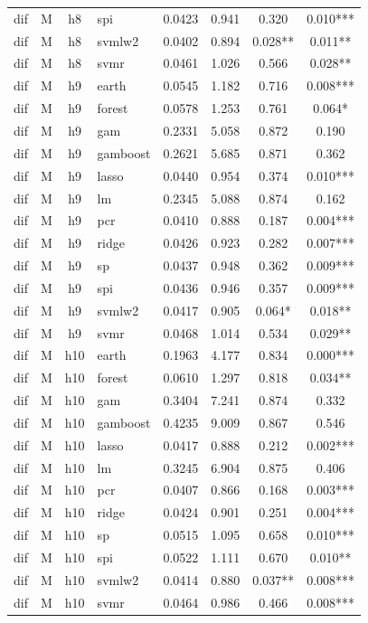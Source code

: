 \begin{ThreePartTable}
\begin{longtable}[t]{llclcccc}
dif & M & h8 & spi & 0.0423 & 0.941 & 0.320 & 0.010***\\
dif & M & h8 & svmlw2 & 0.0402 & 0.894 & 0.028** & 0.011**\\
dif & M & h8 & svmr & 0.0461 & 1.026 & 0.566 & 0.028**\\
\addlinespace
dif & M & h9 & earth & 0.0545 & 1.182 & 0.716 & 0.008***\\
dif & M & h9 & forest & 0.0578 & 1.253 & 0.761 & 0.064*\\
dif & M & h9 & gam & 0.2331 & 5.058 & 0.872 & 0.190\\
dif & M & h9 & gamboost & 0.2621 & 5.685 & 0.871 & 0.362\\
dif & M & h9 & lasso & 0.0440 & 0.954 & 0.374 & 0.010***\\
dif & M & h9 & lm & 0.2345 & 5.088 & 0.874 & 0.162\\
dif & M & h9 & pcr & 0.0410 & 0.888 & 0.187 & 0.004***\\
dif & M & h9 & ridge & 0.0426 & 0.923 & 0.282 & 0.007***\\
dif & M & h9 & sp & 0.0437 & 0.948 & 0.362 & 0.009***\\
dif & M & h9 & spi & 0.0436 & 0.946 & 0.357 & 0.009***\\
dif & M & h9 & svmlw2 & 0.0417 & 0.905 & 0.064* & 0.018**\\
dif & M & h9 & svmr & 0.0468 & 1.014 & 0.534 & 0.029**\\
\addlinespace
dif & M & h10 & earth & 0.1963 & 4.177 & 0.834 & 0.000***\\
dif & M & h10 & forest & 0.0610 & 1.297 & 0.818 & 0.034**\\
dif & M & h10 & gam & 0.3404 & 7.241 & 0.874 & 0.332\\
dif & M & h10 & gamboost & 0.4235 & 9.009 & 0.867 & 0.546\\
dif & M & h10 & lasso & 0.0417 & 0.888 & 0.212 & 0.002***\\
dif & M & h10 & lm & 0.3245 & 6.904 & 0.875 & 0.406\\
dif & M & h10 & pcr & 0.0407 & 0.866 & 0.168 & 0.003***\\
dif & M & h10 & ridge & 0.0424 & 0.901 & 0.251 & 0.004***\\
dif & M & h10 & sp & 0.0515 & 1.095 & 0.658 & 0.010***\\
dif & M & h10 & spi & 0.0522 & 1.111 & 0.670 & 0.010**\\
dif & M & h10 & svmlw2 & 0.0414 & 0.880 & 0.037** & 0.008***\\
dif & M & h10 & svmr & 0.0464 & 0.986 & 0.466 & 0.008***\\

\end{longtable}
\end{ThreePartTable}
